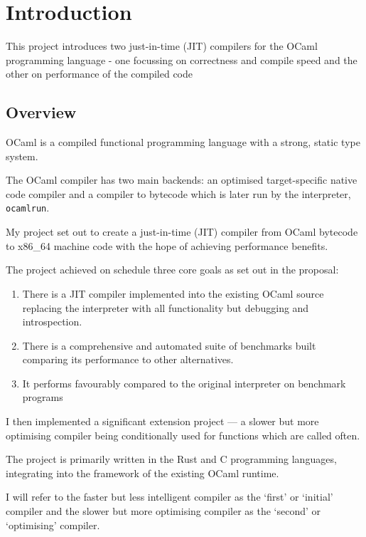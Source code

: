 \chapter{Introduction}

This project introduces two just-in-time (JIT) compilers for the OCaml programming language - one
focussing on correctness and compile speed and the other on performance of the compiled code

\section{Overview}

OCaml is a compiled functional programming language with a strong, static type system.

The OCaml compiler has two main backends: an optimised target-specific native code compiler and a
compiler to bytecode which is later run by the interpreter, \texttt{ocamlrun}.

My project set out to create a just-in-time (JIT) compiler from OCaml bytecode to x86\_64 machine
code with the hope of achieving performance benefits.

The project achieved on schedule three core goals as set out in the proposal:

\begin{enumerate}
      \item There is a JIT compiler implemented into the existing OCaml source
            replacing the interpreter with all functionality but debugging
            and introspection.
      \item There is a comprehensive and automated suite of benchmarks built
            comparing its performance to other alternatives.
      \item It performs favourably compared to the original interpreter on benchmark programs
\end{enumerate}

I then implemented a significant extension project --- a slower but
more optimising compiler being conditionally used for functions which are called often.

The project is primarily written in the Rust and C programming languages, integrating into the
framework of the existing OCaml runtime.

I will refer to the faster but less intelligent compiler as the `first' or `initial' compiler and
the slower but more optimising compiler as the `second' or `optimising' compiler.

